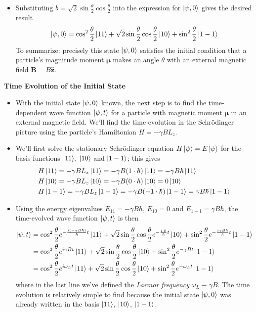 \documentclass[11pt, a4paper]{article}
\newcommand{\Schro}{Schr\"{o}dinger\xspace}
\renewcommand{\vec}[1]{\bm{#1}} %
\newcommand{\uvec}[1]{\hat{\vec{#1}}} %
\newcommand{\m}{\vec{\mu}}  %
\begin{document}
\begin{itemize}
	\item Substituting $ b = \sqrt{2}\sin \frac{\theta}{2} \cos \frac{\theta}{2} $ into the expression for $ \ket{\psi, 0} $ gives the desired result
	\begin{equation*}
		\ket{\psi, 0} = \cos^{2} \frac{\theta}{2} \ket{11} + \sqrt{2}\sin \frac{\theta}{2} \cos \frac{\theta}{2} \ket{10} + \sin^{2}\frac{\theta}{2} \ket{1 -1}
	\end{equation*}
	To summarize: precisely this state $ \ket{\psi, 0} $ satisfies the initial condition that a particle's magnitude moment $ \m $ makes an angle $ \theta $ with an external magnetic field $ \vec{B} = B \uvec{z} $. 
\end{itemize}

\textbf{Time Evolution of the Initial State}
\begin{itemize}
	\item With the initial state $ \ket{\psi, 0} $ known, the next step is to find the time-dependent wave function $ \ket{\psi, t} $ for a particle with magnetic moment $ \m $ in an external magnetic field. We'll find the time evolution in the \Schro picture using the particle's Hamiltonian $ H = -\gamma BL_{z}  $. 
	
	\item We'll first solve the stationary \Schro equation $ H \ket{\psi} = E \ket{\psi} $ for the basis functions $ \ket{11} $, $ \ket{10} $ and $ \ket{1-1} $; this gives
	\begin{align*}
		&H \ket{11} = - \gamma BL_{z}\ket{11} = -\gamma B (1\cdot \hbar) \ket{11} = -\gamma B \hbar \ket{11}\\
		&H\ket{10} = - \gamma BL_{z}\ket{10} = -\gamma B (0\cdot \hbar) \ket{10} = 0 \ket{10}\\
		&H \ket{1-1} = - \gamma BL_{z}\ket{1-1} = -\gamma B (-1\cdot \hbar) \ket{1-1} = \gamma B \hbar \ket{1-1}
	\end{align*}
	
	\item Using the energy eigenvalues $ E_{11} = -\gamma B \hbar $, $ E_{10} = 0 $ and $ E_{1-1} = \gamma B \hbar $, the time-evolved wave function $ \ket{\psi, t} $ is then
	\begin{align*}
		\ket{\psi, t} &= \cos^{2} \frac{\theta}{2} e^{-\frac{i(-\gamma B\hbar)}{\hbar}t}\ket{11} + \sqrt{2}\sin \frac{\theta}{2} \cos \frac{\theta}{2} e^{-\frac{i\cdot 0}{\hbar}t}\ket{10} + \sin^{2}\frac{\theta}{2} e^{-\frac{i\gamma B\hbar}{\hbar}t}\ket{1 -1}\\
		&=\cos^{2} \frac{\theta}{2} e^{i\gamma B t}\ket{11} + \sqrt{2}\sin \frac{\theta}{2} \cos \frac{\theta}{2} \ket{10} + \sin^{2}\frac{\theta}{2} e^{-\gamma B t}\ket{1 -1}\\
		&=\cos^{2} \frac{\theta}{2} e^{i \omega_{L} t}\ket{11} + \sqrt{2}\sin \frac{\theta}{2} \cos \frac{\theta}{2} \ket{10} + \sin^{2}\frac{\theta}{2} e^{-\omega_{L} t}\ket{1 -1}
	\end{align*}
	where in the last line we've defined the \textit{Larmor frequency} $ \omega_{L} \equiv \gamma B $. 	The time evolution is relatively simple to find because the initial state $ \ket{\psi, 0} $ was already written in the basis $ \ket{11} $, $ \ket{10} $, $ \ket{1-1} $. 
	

\end{itemize}
\end{document}
